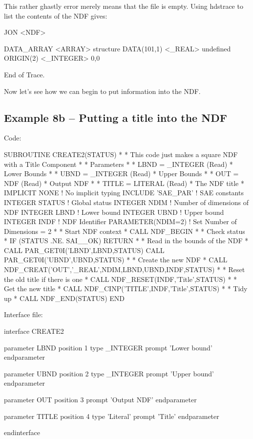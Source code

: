 \documentclass[11pt,nolof]{starlink}
\begin{document}
This rather ghastly error merely means that the file is empty. Using \textsf{hdstrace} to list the contents of the NDF gives:

\begin{small}
\begin{terminalv}
JON  <NDF>

   DATA_ARRAY     <ARRAY>         {structure}
      DATA(101,1)    <_REAL>         {undefined}
      ORIGIN(2)      <_INTEGER>      0,0

End of Trace.
\end{terminalv}
\end{small}

Now let's see how we can begin to put information into the NDF.

\subsection{Example 8b -- Putting a title into the NDF}

Code:

\begin{small}
\begin{terminalv}
       SUBROUTINE CREATE2(STATUS)
*
* This code just makes a square NDF with a Title Component
*
* Parameters
*
* LBND = _INTEGER (Read)
*  Lower Bounds
*
* UBND =  _INTEGER (Read)
*  Upper Bounds
*
* OUT = NDF (Read)
*  Output NDF
*
* TITLE = LITERAL (Read)
*  The NDF title
*
       IMPLICIT NONE     ! No implicit typing
       INCLUDE 'SAE_PAR' ! SAE constants
       INTEGER STATUS    ! Global status
       INTEGER NDIM      ! Number of dimensions of NDF
       INTEGER LBND      ! Lower bound
       INTEGER UBND      ! Upper bound
       INTEGER INDF      ! NDF Identifier
       PARAMETER(NDIM=2) ! Set Number of Dimensions = 2
*
* Start NDF context
*
       CALL NDF_BEGIN
*
* Check status
*
       IF (STATUS .NE. SAI__OK) RETURN
*
* Read in the bounds of the NDF
*
       CALL PAR_GET0I('LBND',LBND,STATUS)
       CALL PAR_GET0I('UBND',UBND,STATUS)
*
* Create the new NDF
*
       CALL NDF_CREAT('OUT','_REAL',NDIM,LBND,UBND,INDF,STATUS)
*
* Reset the old title if there is one
*
       CALL NDF_RESET(INDF,'Title',STATUS)
*
* Get the new title
*
       CALL NDF_CINP('TITLE',INDF,'Title',STATUS)
*
* Tidy up
*
       CALL NDF_END(STATUS)
       END
\end{terminalv}
\end{small}

Interface file:

\begin{small}
\begin{terminalv}
interface CREATE2

  parameter LBND
    position 1
    type _INTEGER
    prompt 'Lower bound'
  endparameter

  parameter UBND
    position 2
    type _INTEGER
    prompt 'Upper bound'
  endparameter

  parameter OUT
    position 3
    prompt 'Output NDF'
  endparameter

  parameter TITLE
    position 4
    type 'Literal'
    prompt 'Title'
  endparameter

endinterface
\end{terminalv}
\end{small}
\end{document}
